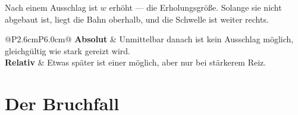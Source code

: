 \begin{merksatz}
Nach einem Ausschlag ist $w$ erhöht --- die Erholungsgröße. Solange sie nicht abgebaut ist, liegt die Bahn oberhalb, und die Schwelle ist weiter rechts.

\begin{center}
\renewcommand{\arraystretch}{1.5}
\begin{tabular}{@{}P{2.6cm}P{6.0cm}@{}}
\toprule
\textbf{Absolut} & Unmittelbar danach ist kein Ausschlag möglich, gleichgültig wie stark gereizt wird.\\
\textbf{Relativ} & Etwas später ist einer möglich, aber nur bei stärkerem Reiz.\\
\bottomrule
\end{tabular}
\end{center}

\begin{center}
\begin{minipage}{0.88\textwidth}
\end{minipage}
\end{center}
\end{merksatz}

\section{Der Bruchfall}

